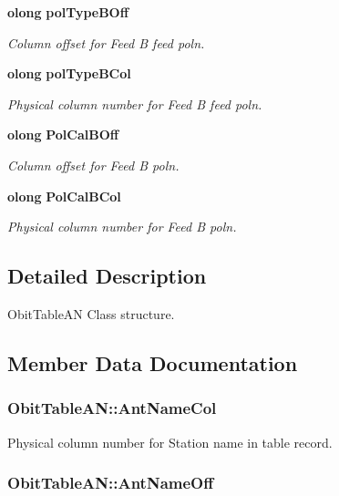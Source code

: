 \begin{CompactItemize}
{\bf olong} {\bf pol\-Type\-BOff}
\begin{CompactList}\small\item\em Column offset for Feed B feed poln. \item\end{CompactList}\item 
{\bf olong} {\bf pol\-Type\-BCol}
\begin{CompactList}\small\item\em Physical column number for Feed B feed poln. \item\end{CompactList}\item 
{\bf olong} {\bf Pol\-Cal\-BOff}
\begin{CompactList}\small\item\em Column offset for Feed B poln. \item\end{CompactList}\item 
{\bf olong} {\bf Pol\-Cal\-BCol}
\begin{CompactList}\small\item\em Physical column number for Feed B poln. \item\end{CompactList}\end{CompactItemize}


\subsection{Detailed Description}
Obit\-Table\-AN Class structure. 



\subsection{Member Data Documentation}
\subsubsection{ {\bf Obit\-Table\-AN::Ant\-Name\-Col}}\label{structObitTableAN_o53}


Physical column number for Station name in table record. 

\subsubsection{ {\bf Obit\-Table\-AN::Ant\-Name\-Off}}\label{structObitTableAN_o52}


